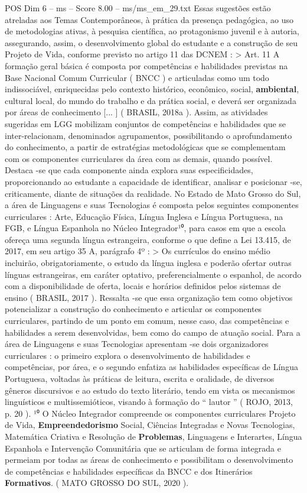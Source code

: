 \begin{textsample}{POS Dim 6 – ms – Score 8.00 – ms/ms\_em\_29.txt}
Essas sugestões estão atreladas aos Temas Contemporâneos, à prática da presença pedagógica, ao uso de metodologias ativas, à pesquisa científica, ao protagonismo juvenil e à autoria, assegurando, assim, o desenvolvimento global do estudante e a construção de seu Projeto de Vida, conforme previsto no artigo 11 das DCNEM : > Art. 11 A formação geral básica é composta por competências e habilidades previstas na Base Nacional Comum Curricular ( BNCC ) e articuladas como um todo indissociável, enriquecidas pelo contexto histórico, econômico, social, \textbf{ambiental}, cultural local, do mundo do trabalho e da prática social, e deverá ser organizada por áreas de conhecimento [... ] ( BRASIL, 2018a ).
Assim, as atividades sugeridas em LGG mobilizam conjuntos de competências e habilidades que se inter-relacionam, denominados agrupamentos, possibilitando o aprofundamento do conhecimento, a partir de estratégias metodológicas que se complementam com os componentes curriculares da área com as demais, quando possível.
Destaca -se que cada componente ainda explora suas especificidades, proporcionando ao estudante a capacidade de identificar, analisar e posicionar -se, criticamente, diante de situações da realidade.
No Estado de Mato Grosso do Sul, a área de Linguagens e suas Tecnologias é composta pelos seguintes componentes curriculares : Arte, Educação Física, Língua Inglesa e Língua Portuguesa, na FGB, e Língua Espanhola no Núcleo Integrador¹⁰, para casos em que a escola ofereça uma segunda língua estrangeira, conforme o que define a Lei 13.415, de 2017, em seu artigo 35 A, parágrafo 4º : > Os currículos do ensino médio incluirão, obrigatoriamente, o estudo da língua inglesa e poderão ofertar outras línguas estrangeiras, em caráter optativo, preferencialmente o espanhol, de acordo com a disponibilidade de oferta, locais e horários definidos pelos sistemas de ensino ( BRASIL, 2017 ).
Ressalta -se que essa organização tem como objetivos potencializar a construção do conhecimento e articular os componentes curriculares, partindo de um ponto em comum, nesse caso, das competências e habilidades a serem desenvolvidas, bem como do campo de atuação social.
Para a área de Linguagens e suas Tecnologias apresentam -se dois organizadores curriculares : o primeiro explora o desenvolvimento de habilidades e competências, por área, e o segundo enfatiza as habilidades específicas de Língua Portuguesa, voltadas às práticas de leitura, escrita e oralidade, de diversos gêneros discursivos e ao estudo do texto literário, tendo em vista os mecanismos linguísticos e multissemióticos, visando à formação do “ lautor ” ( ROJO, 2013, p. 20 ). ¹⁰ O Núcleo Integrador compreende os componentes curriculares Projeto de Vida, \textbf{Empreendedorismo} Social, Ciências Integradas e Novas Tecnologias, Matemática Criativa e Resolução de \textbf{Problemas}, Linguagens e Interartes, Língua Espanhola e Intervenção Comunitária que se articulam de forma integrada e permeiam por todas as áreas de conhecimento e possibilitam o desenvolvimento de competências e habilidades específicas da BNCC e dos Itinerários \textbf{Formativos}. ( MATO GROSSO DO SUL, 2020 ).

\end{textsample}
